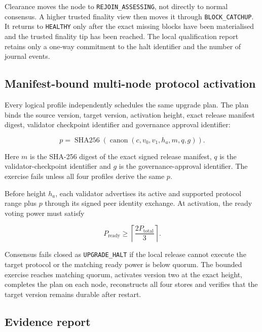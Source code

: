 Clearance moves the node to \texttt{REJOIN\_ASSESSING}, not directly to normal
consensus.  A higher trusted finality view then moves it through
\texttt{BLOCK\_CATCHUP}.  It returns to \texttt{HEALTHY} only after the exact
missing blocks have been materialised and the trusted finality tip has been
reached.  The local qualification report retains only a one-way commitment to
the halt identifier and the number of journal events.

\subsection{Manifest-bound multi-node protocol activation}

Every logical profile independently schedules the same upgrade plan.  The plan
binds the source version, target version, activation height, exact release
manifest digest, validator checkpoint identifier and governance approval
identifier:

\begin{equation}
  p = \operatorname{SHA256}\!\left(
    \operatorname{canon}(c,v_0,v_1,h_a,m,q,g)
  \right).
\end{equation}

Here $m$ is the SHA-256 digest of the exact signed release manifest, $q$ is the
validator-checkpoint identifier and $g$ is the governance-approval identifier.
The exercise fails unless all four profiles derive the same $p$.

Before height $h_a$, each validator advertises its active and supported protocol
range plus $p$ through its signed peer identity exchange.  At activation, the
ready voting power must satisfy

\begin{equation}
  P_{\mathrm{ready}} \ge
  \left\lceil\frac{2P_{\mathrm{total}}}{3}\right\rceil.
\end{equation}

Consensus fails closed as \texttt{UPGRADE\_HALT} if the local release cannot
execute the target protocol or the matching ready power is below quorum.  The
bounded exercise reaches matching quorum, activates version two at the exact
height, completes the plan on each node, reconstructs all four stores and
verifies that the target version remains durable after restart.

\subsection{Evidence report}

